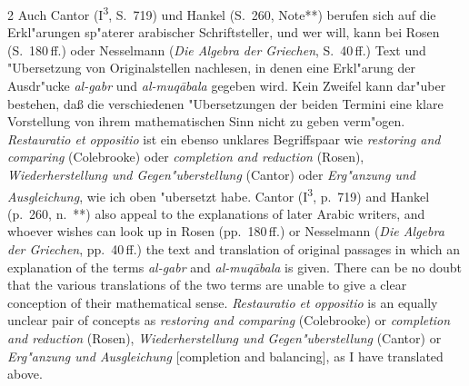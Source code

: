 \documentclass[10pt,a4paper]{article}
\renewcommand{\switchcolumn}{\syncronize\nointerlineskip\columnbreak}
\begin{document}
\begin{paracol}{2}
Auch Cantor (I\textsuperscript{3}, S.\ 719) und Hankel (S.\ 260, Note**) berufen sich auf die Erkl"arungen sp"aterer arabischer Schriftsteller, und wer will, kann bei Rosen (S.\ 180\,ff.) oder Nesselmann (\textit{Die Algebra der Griechen}, S.\ 40\,ff.) Text und "Ubersetzung von Originalstellen nachlesen, in denen eine Erkl"arung der Ausdr"ucke \textit{al-gabr} und \textit{al-muq\=abala} gegeben wird. Kein Zweifel kann dar"uber bestehen, da\ss{} die verschiedenen "Ubersetzungen der beiden Termini eine klare Vorstellung von ihrem mathematischen Sinn nicht zu geben verm"ogen. \textit{Restauratio et oppositio} ist ein ebenso unklares Begriffspaar wie \textit{restoring and comparing} (Colebrooke) oder \textit{completion and reduction} (Rosen), \textit{Wiederherstellung und Gegen"uberstellung} (Cantor) oder \textit{Erg"anzung und Ausgleichung}, wie ich oben "ubersetzt habe.
\switchcolumn
Cantor (I\textsuperscript{3}, p.\ 719) and Hankel (p.\ 260, n.\ **) also appeal to the explanations of later Arabic writers, and whoever wishes can look up in Rosen (pp.\ 180\,ff.) or Nesselmann (\textit{Die Algebra der Griechen}, pp.\ 40\,ff.) the text and translation of original passages in which an explanation of the terms \textit{al-gabr} and \textit{al-muq\=abala} is given. There can be no doubt that the various translations of the two terms are unable to give a clear conception of their mathematical sense. \textit{Restauratio et oppositio} is an equally unclear pair of concepts as \textit{restoring and comparing} (Colebrooke) or \textit{completion and reduction} (Rosen), \textit{Wiederherstellung und Gegen"uberstellung} (Cantor) or \textit{Erg"anzung und Ausgleichung} [completion and balancing], as I have translated above.
\end{paracol}
\end{document}
